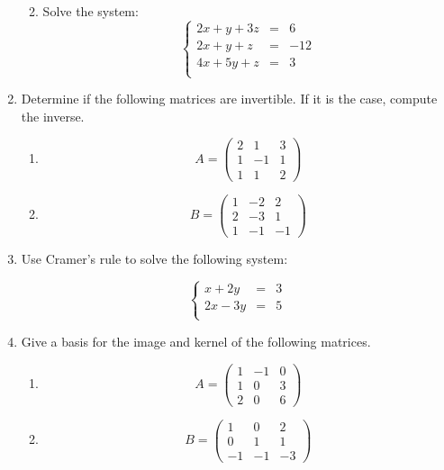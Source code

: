 \documentclass{article}
\begin{document}
\begin{enumerate}
\begin{enumerate}
\vskip 3in

\item Solve the system:
\[ \left\{ 
\begin{array}{ccc} 
2x + y + 3 z & = & 6 \\
2x + y +   z & = & -12 \\
4x + 5y + z  & = & 3 \\
\end{array}
\right.
\]
\end{enumerate}

\newpage

\item Determine if the following matrices are invertible. If it is the case, compute the inverse.
\begin{enumerate}
\item \[ A =\begin{pmatrix} 2 & 1 & 3 \\ 1 & -1 & 1 \\ 1 & 1 & 2 \end{pmatrix}\]
\item \[ B =\begin{pmatrix} 1 & -2 & 2 \\ 2 & -3 & 1 \\ 1 & -1 & -1\end{pmatrix} \]
\end{enumerate}

\vskip 3in

\item Use Cramer's rule to solve the following system:
 
\[\left\{\begin{array}{ccc}
x+2y  & = & 3 \\
2x-3y  & = & 5 \\
\end{array}\right.\]
\newpage

\item Give a basis for the image and kernel of the following matrices. 
\begin{enumerate}
\item \[A= \begin{pmatrix} 1 & -1 & 0 \\ 1 & 0 & 3 \\ 2 & 0 & 6 \end{pmatrix} \]
\vskip 3in
\item \[B= \begin{pmatrix} 1 & 0 & 2 \\ 0 & 1 & 1 \\ -1 & -1 & -3 \end{pmatrix} \]
\end{enumerate}


\end{enumerate}
\end{document}
